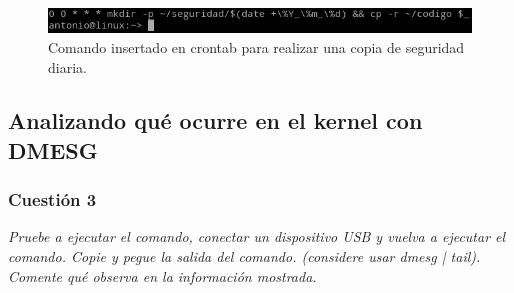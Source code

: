 \begin{figure}[H]
  \begin{center}
    \includegraphics[width=1\textwidth]{imagenes/cron}
    \caption{Comando insertado en crontab para realizar una copia de seguridad diaria.}
    \label{fig1}
  \end{center}
\end{figure}

\subsection{Analizando qué ocurre en el kernel con DMESG}


\subsubsection{Cuestión 3}
\textit{Pruebe a ejecutar el comando, conectar un dispositivo USB y vuelva a ejecutar el comando. Copie y pegue la salida del comando. (considere usar dmesg | tail). Comente qué observa en la información mostrada.}
\newline

